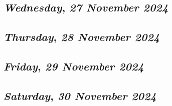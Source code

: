 \def\day{\textit{27 November 2024}}
\def\weekday{\textit{Wednesday}}
\subsection*{\weekday, \day}

\def\day{\textit{28 November 2024}}
\def\weekday{\textit{Thursday}}
\subsection*{\weekday, \day}

\def\day{\textit{29 November 2024}}
\def\weekday{\textit{Friday}}
\subsection*{\weekday, \day}

\def\day{\textit{30 November 2024}}
\def\weekday{\textit{Saturday}}
\subsection*{\weekday, \day}
